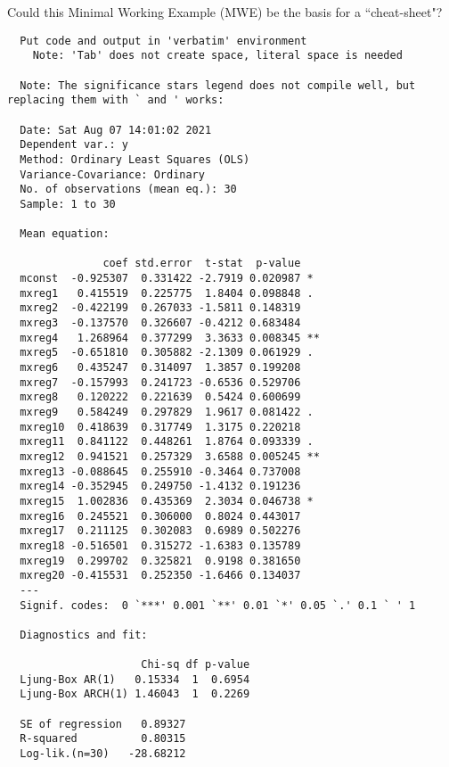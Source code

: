 \documentclass[12pt,a4paper]{article}
\begin{document}
	

Could this Minimal Working Example (MWE) be the basis for a ``cheat-sheet"?

\begin{verbatim}
  Put code and output in 'verbatim' environment
    Note: 'Tab' does not create space, literal space is needed
    
  Note: The significance stars legend does not compile well, but replacing them with ` and ' works:
  
  Date: Sat Aug 07 14:01:02 2021 
  Dependent var.: y 
  Method: Ordinary Least Squares (OLS) 
  Variance-Covariance: Ordinary 
  No. of observations (mean eq.): 30 
  Sample: 1 to 30 
  
  Mean equation:
  
               coef std.error  t-stat  p-value   
  mconst  -0.925307  0.331422 -2.7919 0.020987 * 
  mxreg1   0.415519  0.225775  1.8404 0.098848 . 
  mxreg2  -0.422199  0.267033 -1.5811 0.148319   
  mxreg3  -0.137570  0.326607 -0.4212 0.683484   
  mxreg4   1.268964  0.377299  3.3633 0.008345 **
  mxreg5  -0.651810  0.305882 -2.1309 0.061929 . 
  mxreg6   0.435247  0.314097  1.3857 0.199208   
  mxreg7  -0.157993  0.241723 -0.6536 0.529706   
  mxreg8   0.120222  0.221639  0.5424 0.600699   
  mxreg9   0.584249  0.297829  1.9617 0.081422 . 
  mxreg10  0.418639  0.317749  1.3175 0.220218   
  mxreg11  0.841122  0.448261  1.8764 0.093339 . 
  mxreg12  0.941521  0.257329  3.6588 0.005245 **
  mxreg13 -0.088645  0.255910 -0.3464 0.737008   
  mxreg14 -0.352945  0.249750 -1.4132 0.191236   
  mxreg15  1.002836  0.435369  2.3034 0.046738 * 
  mxreg16  0.245521  0.306000  0.8024 0.443017   
  mxreg17  0.211125  0.302083  0.6989 0.502276   
  mxreg18 -0.516501  0.315272 -1.6383 0.135789   
  mxreg19  0.299702  0.325821  0.9198 0.381650   
  mxreg20 -0.415531  0.252350 -1.6466 0.134037   
  ---
  Signif. codes:  0 `***' 0.001 `**' 0.01 `*' 0.05 `.' 0.1 ` ' 1
  
  Diagnostics and fit:
  
                     Chi-sq df p-value
  Ljung-Box AR(1)   0.15334  1  0.6954
  Ljung-Box ARCH(1) 1.46043  1  0.2269
  
  SE of regression   0.89327
  R-squared          0.80315
  Log-lik.(n=30)   -28.68212
\end{verbatim}
\end{document}
